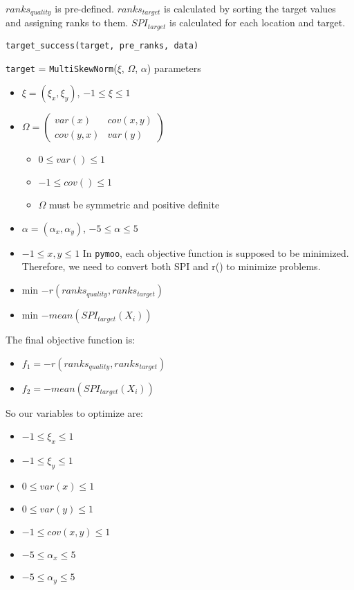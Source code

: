 \documentclass[
  letterpaper,
  DIV=11,
  numbers=noendperiod]{scrartcl}
\providecommand{\tightlist}{%
  \setlength{\itemsep}{0pt}\setlength{\parskip}{0pt}}\usepackage{longtable,booktabs,array}
\begin{document}
\(ranks_{quality}\) is pre-defined. \(ranks_{target}\) is calculated by
sorting the target values and assigning ranks to them. \(SPI_{target}\)
is calculated for each location and target.

\texttt{target\_success(target,\ pre\_ranks,\ data)}

\texttt{target} = \texttt{MultiSkewNorm}(\(\xi\), \(\Omega\),
\(\alpha\)) parameters

\begin{itemize}
\item
  \(\xi = (\xi_x, \xi_y)\), \(-1 \leq \xi \leq 1\)
\item
  \(\Omega = \begin{pmatrix} var(x) & cov(x, y) \\ cov(y, x) & var(y) \end{pmatrix}\)

  \begin{itemize}
  \tightlist
  \item
    \(0 \leq var() \leq 1\)
  \item
    \(-1 \leq cov() \leq 1\)
  \item
    \(\Omega\) must be symmetric and positive definite
  \end{itemize}
\item
  \(\alpha = (\alpha_x, \alpha_y)\), \(-5 \leq \alpha \leq 5\)
\item
  \(-1 \leq x, y \leq 1\) In \texttt{pymoo}, each objective function is
  supposed to be minimized. Therefore, we need to convert both SPI and
  r() to minimize problems.
\item
  min \(-r(ranks_{quality}, ranks_{target})\)
\item
  min \(-mean(SPI_{target}(X_i))\)
\end{itemize}

The final objective function is:

\begin{itemize}
\tightlist
\item
  \(f_1 = -r(ranks_{quality}, ranks_{target})\)
\item
  \(f_2 = -mean(SPI_{target}(X_i))\)
\end{itemize}

So our variables to optimize are:

\begin{itemize}
\tightlist
\item
  \(-1 \leq \xi_x \leq 1\)
\item
  \(-1 \leq \xi_y \leq 1\)
\item
  \(0 \leq var(x) \leq 1\)
\item
  \(0 \leq var(y) \leq 1\)
\item
  \(-1 \leq cov(x, y) \leq 1\)
\item
  \(-5 \leq \alpha_x \leq 5\)
\item
  \(-5 \leq \alpha_y \leq 5\)
\end{itemize}
\end{document}
